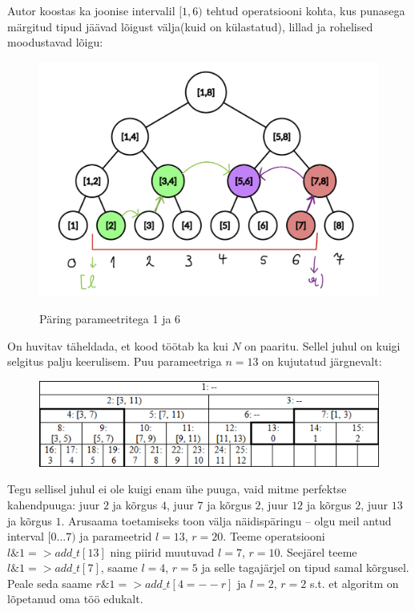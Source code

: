 \documentclass{trkut}
\theoremstyle{definition}
\begin{document}
Autor koostas ka joonise intervalil $[1, 6)$ tehtud operatsiooni kohta, kus punasega märgitud tipud jäävad lõigust välja(kuid on külastatud), lillad ja rohelised moodustavad lõigu:
\begin{figure}[H]%
    \includegraphics[width=12cm]{jonis2.png}%
    \caption{Päring parameetritega 1 ja 6}%
    \label{joonis}%
\end{figure}


On huvitav täheldada, et kood töötab ka kui $N$ on paaritu. \parencite{cfpuu}
Sellel juhul on kuigi selgitus palju keerulisem. 
Puu parameetriga $n=13$ on kujutatud järgnevalt:
\begin{figure}[H]%
    \includegraphics[width=12cm]{LIHTPUU2.png}%
    \caption{}%
    \label{joonis}%
\end{figure}

Tegu sellisel juhul ei ole kuigi enam ühe puuga, vaid mitme perfektse kahendpuuga: juur $2$ ja kõrgus $4$, juur $7$ ja kõrgus $2$, juur $12$ ja kõrgus $2$, juur $13$ ja kõrgus $1$. 
Arusaama toetamiseks toon välja näidispäringu -- olgu meil antud interval $[0...7)$ ja parameetrid $l=13$, $r=20$. Teeme operatsiooni $l\&1 => add\_t[13]$ ning piirid muutuvad $l=7$, $r=10$. Seejärel teeme $l\&1 => add\_t[7]$, saame $l=4$, $r=5$ ja selle tagajärjel on tipud samal kõrgusel. Peale seda saame $r\&1 => add\_t[4 = --r]$ ja $l=2$, $r=2$ s.t. et algoritm on lõpetanud oma töö edukalt. \parencite{cfpuu}
\end{document}

